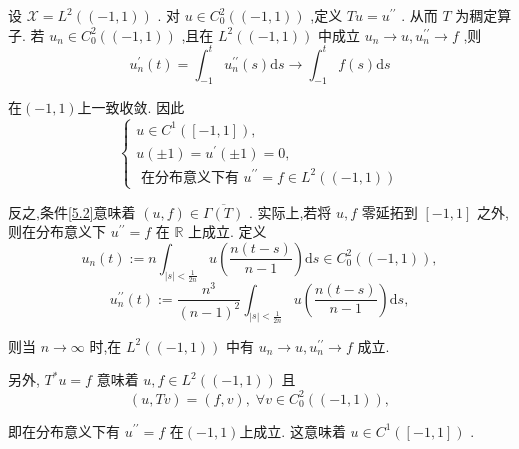 \documentclass[lang=cn,newtx,10pt,scheme=chinese,thmcnt=chapter]{elegantbook}
\newcommand{\dif}{\mathrm{d}}
\begin{document}
\begin{example}
     设 \(\mathcal{X} = {L}^{2}\left( \left( {-1,1}\right) \right)\) . 对 \(u \in  {C}_{0}^{2}\left( \left( {-1,1}\right) \right)\) ,定义 \({Tu} = {u}^{\prime \prime }\) . 从而 \(T\) 为稠定算子. 若 \({u}_{n} \in  {C}_{0}^{2}\left( \left( {-1,1}\right) \right)\) ,且在 \({L}^{2}\left( \left( {-1,1}\right) \right)\) 中成立 \({u}_{n} \rightarrow  u,{u}_{n}^{\prime \prime } \rightarrow  f\) ,则
\begin{equation*}
{u}_{n}^{\prime }\left( t\right)  = {\int }_{-1}^{t}{u}_{n}^{\prime \prime }\left( s\right) {\dif s} \rightarrow  {\int }_{-1}^{t}f\left( s\right) {\dif s}
\end{equation*}

在$(-1,1)$上一致收敛. 因此
\begin{equation}
\left\{  \begin{array}{l} u \in  {C}^{1}\left( \left\lbrack  {-1,1}\right\rbrack  \right) , \\  u\left( {\pm 1}\right)  = {u}^{\prime }\left( {\pm 1}\right)  = 0, \\  \text{ 在分布意义下有 }{u}^{\prime \prime } = f \in  {L}^{2}\left( \left( {-1,1}\right) \right)  \end{array}\right.  \label{5.2}
\end{equation}

反之,条件\ref{5.2}意味着 \(\left( {u,f}\right)  \in  \overline{\Gamma \left( T\right) }\) . 实际上,若将 \(u,f\) 零延拓到 \(\left\lbrack  {-1,1}\right\rbrack\) 之外,则在分布意义下 \({u}^{\prime \prime } = f\) 在 \(\mathbb{R}\) 上成立. 定义
\begin{equation*}
{u}_{n}\left( t\right)  \mathrel{\text{ := }} n{\int }_{\left| s\right|  < \frac{1}{2n}}u\left( \frac{n\left( {t - s}\right) }{n - 1}\right) {\dif s} \in  {C}_{0}^{2}\left( \left( {-1,1}\right) \right) ,
\end{equation*}
\begin{equation*}
{u}_{n}^{\prime \prime }\left( t\right)  \mathrel{\text{ := }} \frac{{n}^{3}}{{\left( n - 1\right) }^{2}}{\int }_{\left| s\right|  < \frac{1}{2n}}u\left( \frac{n\left( {t - s}\right) }{n - 1}\right) {\dif s},
\end{equation*}

则当 \(n \rightarrow  \infty\) 时,在 \({L}^{2}\left( \left( {-1,1}\right) \right)\) 中有 \({u}_{n} \rightarrow  u,{u}_{n}^{\prime \prime } \rightarrow  f\) 成立.

另外, \({T}^{ * }u = f\) 意味着 \(u,f \in  {L}^{2}\left( \left( {-1,1}\right) \right)\) 且
\begin{equation*}
\left( {u,{Tv}}\right)  = \left( {f,v}\right) ,\;\forall v \in  {C}_{0}^{2}\left( \left( {-1,1}\right) \right) ,
\end{equation*}

即在分布意义下有 \({u}^{\prime \prime } = f\) 在$(-1,1)$上成立. 这意味着 \(u \in  {C}^{1}\left( \left\lbrack  {-1,1}\right\rbrack  \right)\) .

\end{example}
\end{document}
